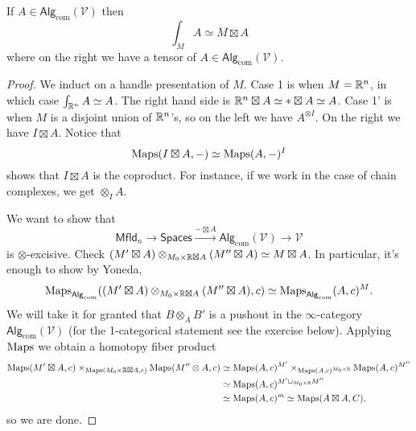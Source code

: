\documentclass{amsart}
\begin{document}
\begin{theorem}
    If $A\in\mathsf{Alg}_\text{com}(\mathcal{V})$ then
    \begin{equation*}
        \int_M A \simeq M\boxtimes A
    \end{equation*}
    where on the right we have a tensor of $A\in\mathsf{Alg}_\text{com}(\mathcal{V})$.
\end{theorem}
\begin{proof}
    We induct on a handle presentation of $M$. Case 1 is when $M=\mathbb{R}^n$, in which case $\int_{\mathbb{R}^n}A\simeq A$.
    The right hand side is $\mathbb{R}^n\boxtimes A\simeq *\boxtimes A\simeq A$. Case 1' is when $M$
    is a disjoint union of $\mathbb{R}^n$'s, so on the left we have $A^{\otimes I}$. On the right we have
    $I\boxtimes A$. Notice that
    \begin{equation*}
        \operatorname{Maps}(I\boxtimes A,-)\simeq \operatorname{Maps}(A,-)^I
    \end{equation*}
    shows that $I\boxtimes A$ is the coproduct. For instance, if we work in the case of
    chain complexes, we get $\otimes_I A$.

    We want to show that
    \begin{equation*}
        \mathsf{Mfld}_n\to\mathsf{Spaces}\xrightarrow{-\boxtimes A}\mathsf{Alg}_\text{com}(\mathcal{V})\to \mathcal{V}
    \end{equation*}
    is $\otimes$-excisive. Check $(M'\boxtimes A)\otimes_{M_0\times\mathbb{R}\boxtimes A}(M''\boxtimes A)\simeq M\boxtimes A$.
    In particular, it's enough to show by Yoneda,
    \begin{equation*}
        \operatorname{Maps}_{\mathsf{Alg}_\text{com}}((M'\boxtimes A)\otimes_{M_0\times\mathbb{R}\boxtimes A}(M''\boxtimes A),c)\simeq \operatorname{Maps}_{\mathsf{Alg}_\text{com}}(A,c)^M.
    \end{equation*}
    We will take it for granted that $B\otimes_AB'$ is a pushout in the $\infty$-category $\mathsf{Alg}_\text{com}(\mathcal{V})$
    (for the 1-categorical statement see the exercise below). Applying $\operatorname{Maps}$ we obtain a homotopy fiber
    product
    \begin{align*}
        \operatorname{Maps}(M'\boxtimes A,c) \times_{\operatorname{Maps}(M_0\times\mathbb{R}\boxtimes A,c)}\operatorname{Maps}(M''\otimes A,c) &\simeq \operatorname{Maps}(A,c)^{M'}\times_{\operatorname{Maps}(A,c)^{M_0\times\mathbb{R}}}\operatorname{Maps}(A,c)^{M''} \\
        &\simeq \operatorname{Maps}(A,c)^{M'\sqcup_{M_0\times\mathbb{R}}M''} \\
        &\simeq \operatorname{Maps}(A,c)^m \simeq \operatorname{Maps}(A\boxtimes A,C),
    \end{align*}
    so we are done.
\end{proof}
\end{document}

